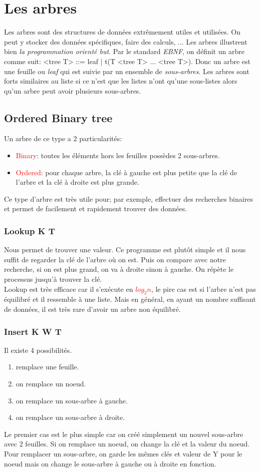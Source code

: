 \documentclass{report}
\begin{document}
\section{Les arbres}
Les arbres sont des structures de données extrêmement utiles et utilisées. On peut y stocker des données spécifiques, faire des calculs, ... Les arbres illustrent bien \textit{la programmation orienté but}. Par le standard \textit{EBNF}, on définit un arbre comme suit: <tree T> ::= leaf | t(T <tree T> ... <tree T>). Donc un arbre est une feuille ou \textit{leaf} qui est suivie par un ensemble de \textit{sous-arbres}. Les arbres sont forts similaires au liste si ce n'est que les listes n'ont qu'une sous-listes alors qu'un arbre peut avoir plusieurs sous-arbres.

\subsection{Ordered Binary tree}
Un arbre de ce type a 2 particularités:
\begin{itemize}
\item \textcolor{red}{Binary}: toutes les éléments hors les feuilles possèdes 2 sous-arbres.
\item \textcolor{red}{Ordered}: pour chaque arbre, la clé à gauche est plus petite que la clé de l'arbre et la clé à droite est plus grande.
\end{itemize}
Ce type d'arbre est très utile pour; par exemple, effectuer des recherches binaires et permet de facilement et rapidement trouver des données.

\subsubsection{Lookup K T}
Nous permet de trouver une valeur. Ce programme est plutôt simple et il nous suffit de regarder la clé de l'arbre où on est. Puis on compare avec notre recherche, si on est plus grand, on va à droite sinon à gauche. On répète le processus jusqu'à trouver la clé.\\
Lookup est très efficace car il s'exécute en \textcolor{red}{$log_2 n$}, le pire cas est si l'arbre n'est pas équilibré et il ressemble à une liste. Mais en général, en ayant un nombre suffisant de données, il est très rare d'avoir un arbre non équilibré.
\subsubsection{Insert K W T}
Il existe 4 possibilités.
\begin{enumerate}
\item remplace une feuille.
\item on remplace un noeud.
\item on remplace un sous-arbre à gauche.
\item on remplace un sous-arbre à droite.
\end{enumerate}
Le premier cas est le plus simple car on créé simplement un nouvel sous-arbre avec 2 feuilles. Si on remplace un noeud, on change la clé et la valeur du noeud.
Pour remplacer un sous-arbre, on garde les mêmes clés et valeur de Y pour le noeud mais on change le sous-arbre à gauche ou à droite en fonction.
\end{document}
